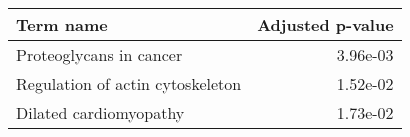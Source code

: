 \begin{tabular}{lr}
\toprule
                       Term name &  Adjusted p-value \\
\midrule
         Proteoglycans in cancer &          3.96e-03 \\
Regulation of actin cytoskeleton &          1.52e-02 \\
          Dilated cardiomyopathy &          1.73e-02 \\
\bottomrule
\end{tabular}
